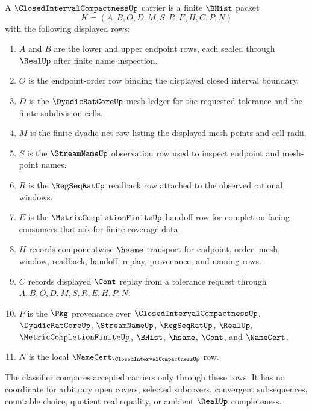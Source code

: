 \begin{definition}
\label{def:closed-interval-compactness-carrier}
A $\ClosedIntervalCompactnessUp$ carrier is a finite $\BHist$ packet
$$
K=(A,B,O,D,M,S,R,E,H,C,P,N)
$$
with the following displayed rows:
\begin{enumerate}
\item $A$ and $B$ are the lower and upper endpoint rows, each sealed through $\RealUp$ after finite name inspection.
\item $O$ is the endpoint-order row binding the displayed closed interval boundary.
\item $D$ is the $\DyadicRatCoreUp$ mesh ledger for the requested tolerance and the finite subdivision cells.
\item $M$ is the finite dyadic-net row listing the displayed mesh points and cell radii.
\item $S$ is the $\StreamNameUp$ observation row used to inspect endpoint and mesh-point names.
\item $R$ is the $\RegSeqRatUp$ readback row attached to the observed rational windows.
\item $E$ is the $\MetricCompletionFiniteUp$ handoff row for completion-facing consumers that ask for finite coverage data.
\item $H$ records componentwise $\hsame$ transport for endpoint, order, mesh, window, readback, handoff, replay, provenance, and naming rows.
\item $C$ records displayed $\Cont$ replay from a tolerance request through $A,B,O,D,M,S,R,E,H,P,N$.
\item $P$ is the $\Pkg$ provenance over $\ClosedIntervalCompactnessUp$, $\DyadicRatCoreUp$, $\StreamNameUp$, $\RegSeqRatUp$, $\RealUp$, $\MetricCompletionFiniteUp$, $\BHist$, $\hsame$, $\Cont$, and $\NameCert$.
\item $N$ is the local $\NameCert_{\ClosedIntervalCompactnessUp}$ row.
\end{enumerate}
The classifier compares accepted carriers only through these rows. It has no coordinate for arbitrary open covers, selected subcovers, convergent subsequences, countable choice, quotient real equality, or ambient $\RealUp$ completeness.
\end{definition}

